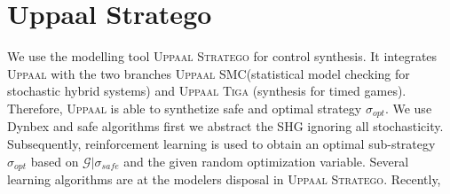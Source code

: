 





\section{Uppaal Stratego} 
    \label{sec:uppaalstratego}
    We use the modelling tool \textsc{Uppaal Stratego} for control 
    synthesis. It integrates \textsc{Uppaal} with the two branches
    \textsc{Uppaal SMC}(statistical model checking for stochastic 
    hybrid systems) and \textsc{Uppaal Tiga} (synthesis for timed games).
    Therefore, \textsc{Uppaal} is able to synthetize safe and
    optimal strategy $\sigma_{opt}$. We use Dynbex and safe algorithms
    first we abstract the \ac{SHG} ignoring all stochasticity.
    Subsequently, reinforcement learning is used to obtain an 
    optimal sub-strategy $\sigma_{opt}$ based on $\mathcal{G}|
    \sigma_{safe}$ and the given random optimization variable.
    Several learning algorithms are at the modelers disposal in 
    \textsc{Uppaal Stratego}. Recently, 

